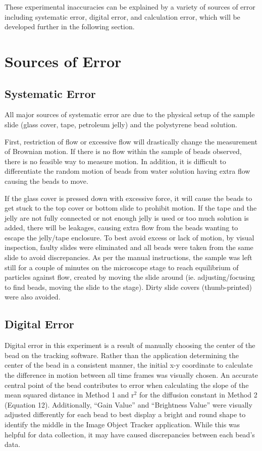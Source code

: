 \documentclass[12pt, letterpaper, twoside]{article}
\begin{document}
These experimental inaccuracies can be explained by a variety of sources of error including systematic error, digital error, and calculation error, which will be developed further in the following section.

\section{Sources of Error}

\subsection{Systematic Error}

All major sources of systematic error are due to the physical setup of the sample slide (glass cover, tape, petroleum jelly) and the polystyrene bead solution.

First, restriction of flow or excessive flow will drastically change the measurement of Brownian motion. If there is no flow within the sample of beads observed, there is no feasible way to measure motion. In addition, it is difficult to differentiate the random motion of beads from water solution having extra flow causing the beads to move. 

If the glass cover is pressed down with excessive force, it will cause the beads to get stuck to the top cover or bottom slide to prohibit motion. If the tape and the jelly are not fully connected or not enough jelly is used or too much solution is added, there will be leakages, causing extra flow from the beads wanting to escape the jelly/tape enclosure. To best avoid excess or lack of motion, by visual inspection, faulty slides were eliminated and all beads were taken from the same slide to avoid discrepancies. As per the manual instructions, the sample was left still for a couple of minutes on the microscope stage to reach equilibrium of particles against flow, created by moving the slide around (ie. adjusting/focusing to find beads, moving the slide to the stage). Dirty slide covers (thumb-printed) were also avoided.

\subsection{Digital Error}

Digital error in this experiment is a result of manually choosing the center of the bead on the tracking software. Rather than the application determining the center of the bead in a consistent manner, the initial x-y coordinate to calculate the difference in motion between all time frames was visually chosen. An accurate central point of the bead contributes to error when calculating the slope of the mean squared distance in Method 1 and r$^2$ for the diffusion constant in Method 2 (Equation 12). Additionally, “Gain Value” and “Brightness Value” were visually adjusted differently for each bead to best display a bright and round shape to identify the middle in the Image Object Tracker application. While this was helpful for data collection, it may have caused discrepancies between each bead’s data.
\end{document}
